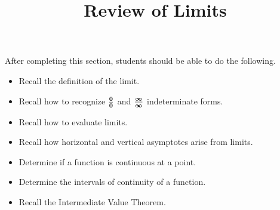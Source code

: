 \documentclass{ximera}
\title{Review of Limits}
\begin{document}
\begin{abstract} 
\end{abstract}

\maketitle

\begin{sectionOutcomes}
After completing this section, students should be able to do the following.

\begin{itemize}
	\item Recall the definition of the limit.
	\item Recall how to recognize $\boldsymbol{\tfrac{0}{0}}$ and $\boldsymbol{\tfrac{\infty}{\infty}}$ indeterminate forms.
	\item Recall how to evaluate limits.
	\item Recall how horizontal and vertical asymptotes arise from limits.
	\item Determine if a function is continuous at a point.
	\item Determine the intervals of continuity of a function.
	\item Recall the Intermediate Value Theorem.
\end{itemize}
\end{sectionOutcomes}
\end{document}
